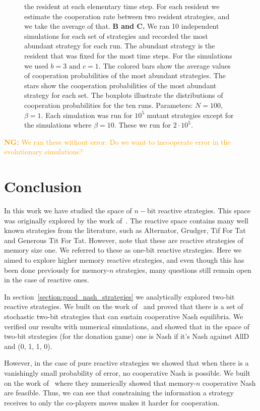 \documentclass{article}
\theoremstyle{definition}
\newcommand{\nikoleta}[1]{\textcolor{orange}{{\bf NG:} #1}}
\begin{document}
\begin{figure}[htbp]
{  the resident at each elementary time step. For each resident we estimate the
  cooperation rate between two resident strategies, and we take the average of
  that. 
  \textbf{B and C.} We ran 10 independent simulations for each set of strategies
  and recorded the most abundant strategy for each run. The abundant strategy is
  the resident that was fixed for the most time steps. For the simulations we
  used \(b=3 \text{ and } c=1\). The colored bars show the average values of
  cooperation probabilities of the most abundant strategies. The stars show the
  cooperation probabilities of the most abundant strategy for each set. The
  boxplots illustrate the distributions of cooperation probabilities for the ten
  runs.
  Parameters: \(N=100\), \(\beta=1\). Each simulation was run for \(10 ^ {5}\)
  mutant strategies except for the simulations where \(\beta=10\). These we
  run for \(2 \cdot 10 ^ {5}\).}\label{fig:three_graphs}
\end{figure}

\nikoleta{We ran these without error. Do we want to incooperate error in the
evolutionary simulations?}

\section{Conclusion}

In this work we have studied the space of \(n-\)bit reactive strategies. This
space was originally explored by the work of~\citep{nowak:AAM:1990}. The
reactive space contains many well known strategies from the literature, such as
Alternator, Grudger, Tif For Tat and Generous Tit For Tat. However, note that
these are reactive strategies of memory size one. We referred to these as
one-bit reactive strategies. Here we aimed to explore higher memory reactive
strategies, and even though this has been done previously for memory-\(n\)
strategies, many questions still remain open in the case of reactive ones.

In section~\ref{section:good_nash_strategies} we analytically explored two-bit
reactive strategies. We built on the work of~\citep{akin:EGADS:2016} and proved
that there is a set of stochastic two-bit strategies that can sustain
cooperative Nash equilibria. We verified our results with numerical simulations,
and showed that in the space of two-bit strategies (for the donation game) one
is Nash if it's Nash against AllD and (0, 1, 1, 0).

However, in the case of pure reactive strategies we showed that when there is a
vanishingly small probability of error, no cooperative Nash is possible. We
built on the work of~\citep{hilbe:PNAS:2017} where they numerically showed that
memory-\(n\) cooperative Nash are feasible. Thus, we can see that constraining
the information a strategy receives to only the co-players moves makes it harder
for cooperation.
\end{document}
